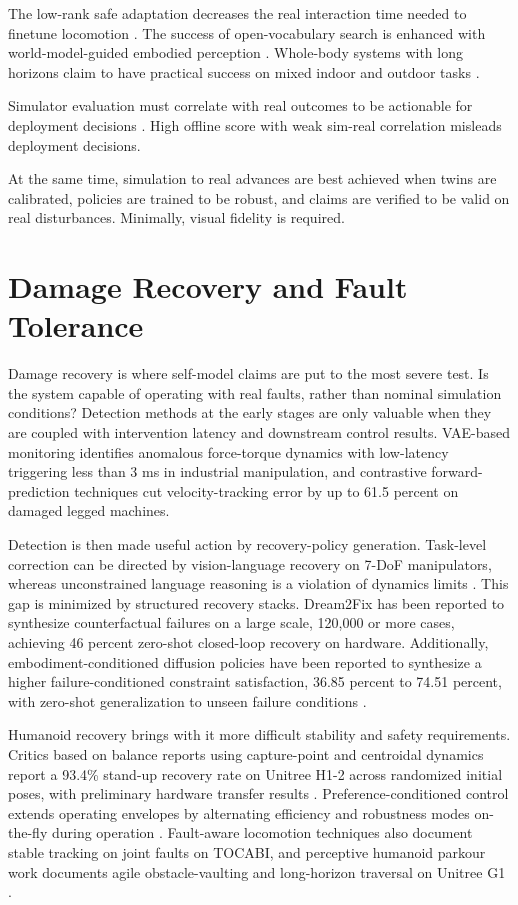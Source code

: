 \documentclass[11pt,a4paper]{article}
\begin{document}
The low-rank safe adaptation decreases the real interaction time needed to finetune locomotion \cite{daneshmand2026slowrl}. The success of open-vocabulary search is enhanced with world-model-guided embodied perception \cite{yin2025womap}. Whole-body systems with long horizons claim to have practical success on mixed indoor and outdoor tasks \cite{wang2025odyssey}.

Simulator evaluation must correlate with real outcomes to be actionable for deployment decisions \cite{jain2025polaris,li2024simpler}. High offline score with weak sim-real correlation misleads deployment decisions.

At the same time, simulation to real advances are best achieved when twins are calibrated, policies are trained to be robust, and claims are verified to be valid on real disturbances. Minimally, visual fidelity is required.

\section{Damage Recovery and Fault Tolerance}
\label{sec:damage_recovery}

Damage recovery is where self-model claims are put to the most severe test. Is the system capable of operating with real faults, rather than nominal simulation conditions? Detection methods at the early stages are only valuable when they are coupled with intervention latency and downstream control results. VAE-based monitoring identifies anomalous force-torque dynamics with low-latency triggering less than 3 ms in industrial manipulation, and contrastive forward-prediction techniques cut velocity-tracking error by up to 61.5 percent on damaged legged machines.

Detection is then made useful action by recovery-policy generation. Task-level correction can be directed by vision-language recovery on 7-DoF manipulators, whereas unconstrained language reasoning is a violation of dynamics limits \cite{chen2024vlm}. This gap is minimized by structured recovery stacks. Dream2Fix has been reported to synthesize counterfactual failures on a large scale, 120,000 or more cases, achieving 46 percent zero-shot closed-loop recovery on hardware. Additionally, embodiment-conditioned diffusion policies have been reported to synthesize a higher failure-conditioned constraint satisfaction, 36.85 percent to 74.51 percent, with zero-shot generalization to unseen failure conditions \cite{briscoe2025deft}.

Humanoid recovery brings with it more difficult stability and safety requirements. Critics based on balance reports using capture-point and centroidal dynamics report a 93.4\% stand-up recovery rate on Unitree H1-2 across randomized initial poses, with preliminary hardware transfer results \cite{poddar2026embedding}. Preference-conditioned control extends operating envelopes by alternating efficiency and robustness modes on-the-fly during operation \cite{li2026pchc}. Fault-aware locomotion techniques also document stable tracking on joint faults on TOCABI, and perceptive humanoid parkour work documents agile obstacle-vaulting and long-horizon traversal on Unitree G1 \cite{lee2026tolebi,wu2026parkour}.
\end{document}
